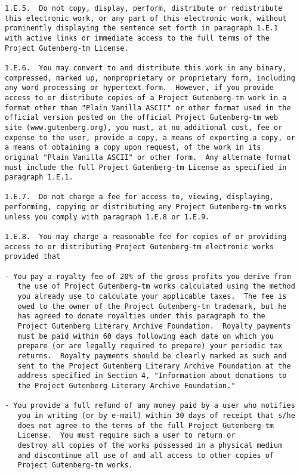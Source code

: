 \documentclass[letterpaper,12pt,oneside,openany]{memoir}
\begin{document}
\begin{verbatim}
1.E.5.  Do not copy, display, perform, distribute or redistribute
this electronic work, or any part of this electronic work, without
prominently displaying the sentence set forth in paragraph 1.E.1
with active links or immediate access to the full terms of the
Project Gutenberg-tm License.

1.E.6.  You may convert to and distribute this work in any binary,
compressed, marked up, nonproprietary or proprietary form, including
any word processing or hypertext form.  However, if you provide
access to or distribute copies of a Project Gutenberg-tm work in a
format other than "Plain Vanilla ASCII" or other format used in the
official version posted on the official Project Gutenberg-tm web
site (www.gutenberg.org), you must, at no additional cost, fee or
expense to the user, provide a copy, a means of exporting a copy, or
a means of obtaining a copy upon request, of the work in its
original "Plain Vanilla ASCII" or other form.  Any alternate format
must include the full Project Gutenberg-tm License as specified in
paragraph 1.E.1.

1.E.7.  Do not charge a fee for access to, viewing, displaying,
performing, copying or distributing any Project Gutenberg-tm works
unless you comply with paragraph 1.E.8 or 1.E.9.

1.E.8.  You may charge a reasonable fee for copies of or providing
access to or distributing Project Gutenberg-tm electronic works
provided that

- You pay a royalty fee of 20% of the gross profits you derive from
   the use of Project Gutenberg-tm works calculated using the method
   you already use to calculate your applicable taxes.  The fee is
   owed to the owner of the Project Gutenberg-tm trademark, but he
   has agreed to donate royalties under this paragraph to the
   Project Gutenberg Literary Archive Foundation.  Royalty payments
   must be paid within 60 days following each date on which you
   prepare (or are legally required to prepare) your periodic tax
   returns.  Royalty payments should be clearly marked as such and
   sent to the Project Gutenberg Literary Archive Foundation at the
   address specified in Section 4, "Information about donations to
   the Project Gutenberg Literary Archive Foundation."

- You provide a full refund of any money paid by a user who notifies
   you in writing (or by e-mail) within 30 days of receipt that s/he
   does not agree to the terms of the full Project Gutenberg-tm
   License.  You must require such a user to return or
   destroy all copies of the works possessed in a physical medium
   and discontinue all use of and all access to other copies of
   Project Gutenberg-tm works.


\end{verbatim}
\end{document}
